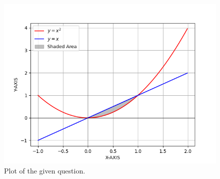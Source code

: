 \documentclass[journal]{IEEEtran}
\begin{document}
\begin{figure}[h]
\centering
\includegraphics[width=\columnwidth]{figs/fig.png}
\caption{Plot of the given question.}
\label{fig:Plot1} 
\end{figure}
\end{document}
